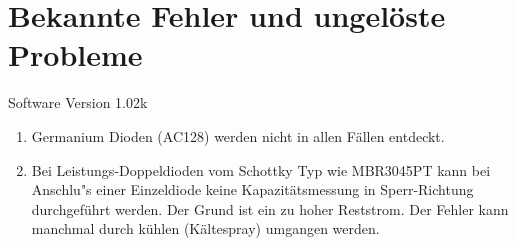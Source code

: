 
\chapter{Bekannte Fehler und ungel\"oste Probleme}
{\center Software Version 1.02k}

\begin{enumerate}

\item Germanium Dioden (AC128) werden nicht in allen F\"allen entdeckt.
\item Bei Leistungs-Doppeldioden vom Schottky Typ wie MBR3045PT kann bei Anschlu"s einer Einzeldiode keine Kapazit\"atsmessung in Sperr-Richtung 
durchgef\"uhrt werden. Der Grund ist ein zu hoher Reststrom. Der Fehler kann manchmal durch k\"uhlen (K\"altespray) umgangen werden.

\end{enumerate}
